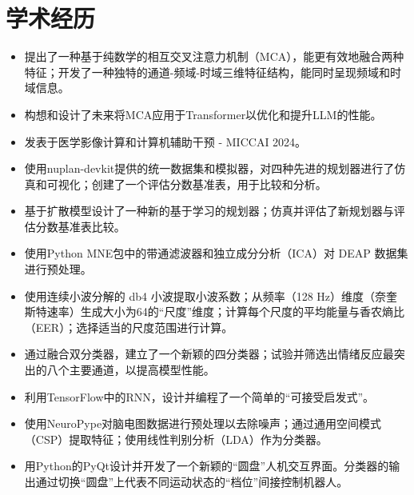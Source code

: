 \documentclass{resume}
\begin{document}
\nocite{*}



\section{学术经历}
\begin{itemize}
    \item 提出了一种基于纯数学的相互交叉注意力机制（MCA），能更有效地融合两种特征；开发了一种独特的通道-频域-时域三维特征结构，能同时呈现频域和时域信息。
    \item 构想和设计了未来将MCA应用于Transformer以优化和提升LLM的性能。
    \item 发表于医学影像计算和计算机辅助干预 - MICCAI 2024。
\end{itemize}

\begin{itemize}
    \item 使用nuplan-devkit提供的统一数据集和模拟器，对四种先进的规划器进行了仿真和可视化；创建了一个评估分数基准表，用于比较和分析。
    \item 基于扩散模型设计了一种新的基于学习的规划器；仿真并评估了新规划器与评估分数基准表比较。
\end{itemize}

\begin{itemize}
    \item 使用Python MNE包中的带通滤波器和独立成分分析（ICA）对 DEAP 数据集进行预处理。
    \item 使用连续小波分解的 db4 小波提取小波系数；从频率（128 Hz）维度（奈奎斯特速率）生成大小为64的“尺度”维度；计算每个尺度的平均能量与香农熵比（EER）；选择适当的尺度范围进行计算。
    \item 通过融合双分类器，建立了一个新颖的四分类器；试验并筛选出情绪反应最突出的八个主要通道，以提高模型性能。
\end{itemize}

\begin{itemize}
    \item 利用TensorFlow中的RNN，设计并编程了一个简单的“可接受启发式”。
    \item 使用NeuroPype对脑电图数据进行预处理以去除噪声；通过通用空间模式（CSP）提取特征；使用线性判别分析（LDA）作为分类器。
    \item 用Python的PyQt设计并开发了一个新颖的“圆盘”人机交互界面。分类器的输出通过切换“圆盘”上代表不同运动状态的“档位”间接控制机器人。
\end{itemize}
\sepspace
\end{document}
